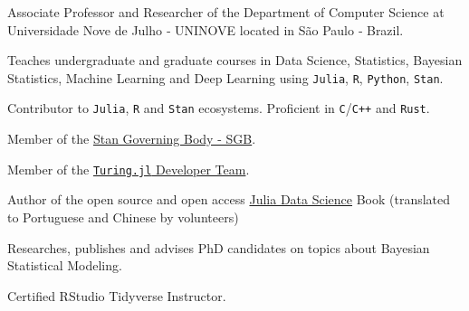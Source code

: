 \vspace{0.25cm}

\begin{cvitems}

	\item Associate Professor and Researcher of the Department of Computer Science at Universidade Nove de Julho ‑
	UNINOVE located in São Paulo ‑ Brazil.
	\item Teaches undergraduate and graduate courses in Data Science, Statistics, Bayesian Statistics,
	Machine Learning and Deep Learning using \texttt{Julia}, \texttt{R}, \texttt{Python}, \texttt{Stan}.
	\item Contributor to \texttt{Julia}, \texttt{R} and \texttt{Stan} ecosystems. Proficient in \texttt{C}/\texttt{C++} and \texttt{Rust}.
	\item Member of the \href{https://mc-stan.org/about/}{Stan Governing Body - SGB}.
	\item Member of the \href{https://turing.ml/dev/team/}{\texttt{Turing.jl} Developer Team}.
	\item Author of the open source and open access \href{https://juliadatascience.io}{Julia Data Science} Book (translated to Portuguese and Chinese by volunteers)
	\item Researches, publishes and advises PhD candidates on topics about Bayesian Statistical Modeling.
	\item Certified RStudio Tidyverse Instructor.

\end{cvitems}
